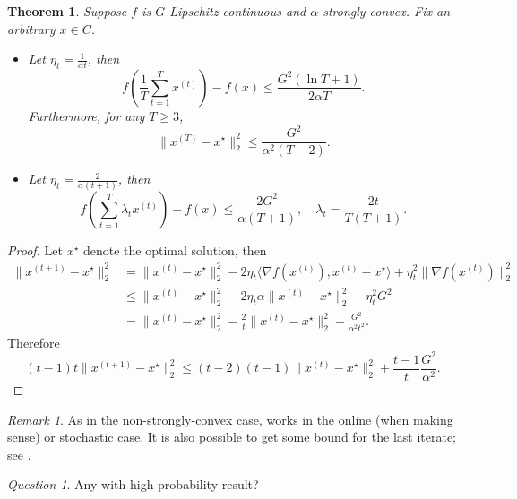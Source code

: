 \documentclass[openany]{book}
\newtheorem{theorem}{Theorem}[chapter]
\theoremstyle{definition}
\theoremstyle{remark}
\newtheorem*{remark}{Remark}
\newtheorem*{question}{Question}
\begin{document}
\begin{theorem}\label{thm:GDStrConvBound}
    Suppose $f$ is $G$-Lipschitz continuous and $\alpha$-strongly convex. Fix an arbitrary $x\in C$.
    \begin{itemize}
        \item Let $\eta_t=\frac{1}{\alpha t}$, then
        \begin{equation*}
            f\left(\frac{1}{T}\sum_{t=1}^{T}x^{(t)}\right)-f(x)\le \frac{G^2(\ln T+1)}{2\alpha T}.
        \end{equation*}
        Furthermore, for any $T\ge3$,
        \begin{equation*}
            \|x^{(T)}-x^{\star}\|_2^2\le \frac{G^2}{\alpha^2(T-2)}.
        \end{equation*}
        \item Let $\eta_t=\frac{2}{\alpha(t+1)}$, then
        \begin{equation}
            f\left(\sum_{t=1}^{T}\lambda_tx^{(t)}\right)-f(x)\le \frac{2G^2}{\alpha(T+1)},\quad \lambda_t=\frac{2t}{T(T+1)}.
        \end{equation}
    \end{itemize}
\end{theorem}
\begin{proof}
    Let $x^{\star}$ denote the optimal solution, then
    \begin{align*}
        \|x^{(t+1)}-x^{\star}\|_2^2 & =\|x^{(t)}-x^{\star}\|_2^2-2\eta_t \langle\nabla f(x^{(t)}),x^{(t)}-x^{\star}\rangle+\eta_t^2\|\nabla f(x^{(t)})\|_2^2 \\
         & \le\|x^{(t)}-x^{\star}\|_2^2-2\eta_t\alpha\|x^{(t)}-x^{\star}\|_2^2+\eta_t^2G^2 \\
         & =\|x^{(t)}-x^{\star}\|_2^2-\frac{2}{t}\|x^{(t)}-x^{\star}\|_2^2+\frac{G^2}{\alpha^2t^2}.
    \end{align*}
    Therefore
    \begin{equation*}
        (t-1)t\|x^{(t+1)}-x^{\star}\|_2^2\le(t-2)(t-1)\|x^{(t)}-x^{\star}\|_2^2+\frac{t-1}{t}\frac{G^2}{\alpha^2}.
    \end{equation*}
\end{proof}
\begin{remark}
    As in the non-strongly-convex case,  works in the online (when making sense) or stochastic case. It is also possible to get some bound for the last iterate; see \cite{SZ13}.
\end{remark}
\begin{question}
    Any with-high-probability result?
\end{question}
\end{document}
